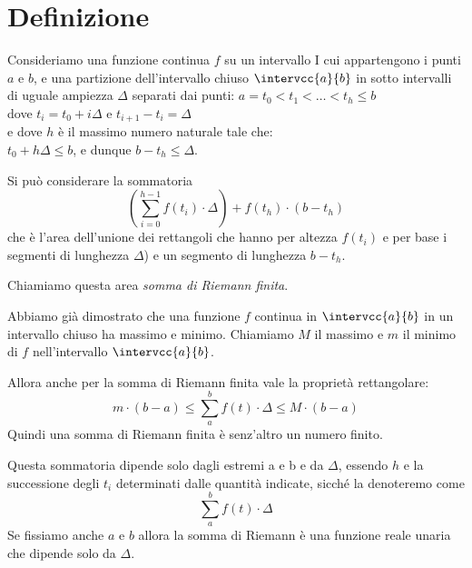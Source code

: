 \section{Definizione}
\label{sec:integrali_definizione}

\begin{minipage}{.39\textwidth}
\begin{inaccessibleblock} 
  \sommariemann
\end{inaccessibleblock}
\end{minipage}
\hfill
\begin{minipage}{.59\textwidth}
\begin{inaccessibleblock} 
Consideriamo una funzione continua \(f\) su un intervallo I cui 
appartengono i punti \(a\) e \(b\), e una partizione dell'intervallo chiuso 
\(\intervcc{a}{b}\) in sotto intervalli di uguale ampiezza \(\Delta\) 
separati dai punti: 
\(a = t_0 < t_1 < \dots < t_h \le b\) \\
dove \(t_i = t_0 +i \Delta\) \quad e \quad \(t_{i+1} - t_i= \Delta\) \\
e dove \(h\) è il massimo numero naturale tale che: \\
\(t_0 + h \Delta \le b\), e dunque \(b-t_h \le \Delta\).
\end{inaccessibleblock}
\end{minipage}


Si può considerare la sommatoria
\[\left(\sum_{i=0}^{h-1} f(t_i)\cdot\Delta \right)+f(t_h)\cdot(b-t_h)\] 
che è l'area dell'unione dei rettangoli che 
hanno per altezza \(f(t_i)\) 
e per base i segmenti di lunghezza \(\Delta\)) e un segmento di lunghezza \(b 
- t_{h}\). 

Chiamiamo questa area \emph{somma di Riemann finita}.

Abbiamo già dimostrato che una funzione \(f\) continua in 
\(\intervcc{a}{b}\) in un intervallo chiuso ha massimo e minimo. 
Chiamiamo \(M\) il massimo e \(m\) il minimo di \(f\) nell'intervallo 
\(\intervcc{a}{b}\).

Allora anche per la somma di Riemann finita vale la proprietà rettangolare: 
\[m\cdot(b - a) \le \sum_a^b f(t) \cdot\Delta \le M\cdot(b - a)\] 
Quindi una somma di Riemann finita è senz'altro un numero finito.

Questa sommatoria dipende solo dagli estremi a e b 
e da \(\Delta\), essendo \(h\) e la successione degli \(t_i\) determinati 
dalle quantità indicate, sicché la denoteremo come 
\[\sum_a^b f(t) \cdot \Delta\] 
Se fissiamo anche \(a\) e \(b\) allora la somma di Riemann è una funzione 
reale unaria che dipende solo da \(\Delta\). 


